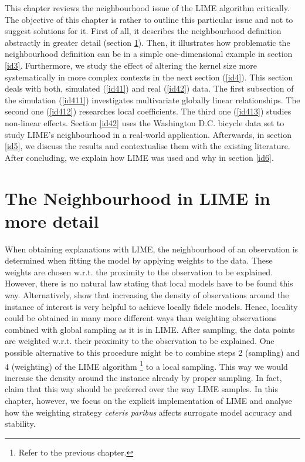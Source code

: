 \documentclass[
]{krantz}
\begin{document}
This chapter reviews the neighbourhood issue of the LIME algorithm critically.
The objective of this chapter is rather to outline this particular issue and not to suggest solutions for it.
First of all, it describes the neighbourhood definition abstractly in greater detail (section \ref{id2}).
Then, it illustrates how problematic the neighbourhood definition can be in a simple one-dimensional example in section \ref{id3}.
Furthermore, we study the effect of altering the kernel size more systematically in more complex contexts in the next section (\ref{id4}).
This section deals with both, simulated (\ref{id41}) and real (\ref{id42}) data.
The first subsection of the simulation (\ref{id411}) investigates multivariate globally linear relationships.
The second one (\ref{id412}) researches local coefficients.
The third one (\ref{id413}) studies non-linear effects.
Section \ref{id42} uses the Washington D.C. bicycle data set to study LIME's neighbourhood in a real-world application.
Afterwards, in section \ref{id5}, we discuss the results and contextualise them with the existing literature.
After concluding, we explain how LIME was used and why in section \ref{id6}.

\hypertarget{id2}{%
\section{The Neighbourhood in LIME in more detail}\label{id2}}

When obtaining explanations with LIME, the neighbourhood of an observation is determined when fitting the model by applying weights to the data.
These weights are chosen w.r.t. the proximity to the observation to be explained.
However, there is no natural law stating that local models have to be found this way.
Alternatively, \citet{craven1996} show that increasing the density of observations around the instance of interest is very helpful to achieve locally fidele models.
Hence, locality could be obtained in many more different ways than weighting observations combined with global sampling as it is in LIME.
After sampling, the data points are weighted w.r.t. their proximity to the observation to be explained.
One possible alternative to this procedure might be to combine steps 2 (sampling) and 4 (weighting) of the LIME algorithm \footnote{Refer to the previous chapter.} to a local sampling.
This way we would increase the density around the instance already by proper sampling.
In fact, \citet{laugel2018defining} claim that this way should be preferred over the way LIME samples.
In this chapter, however, we focus on the explicit implementation of LIME and analyse how the weighting strategy \emph{ceteris paribus} affects surrogate model accuracy and stability.
\end{document}
